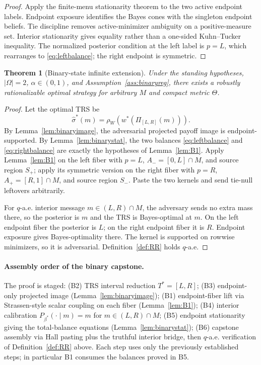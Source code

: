 \documentclass[11pt]{article}
\newtheorem{theorem}{Theorem}
\theoremstyle{definition}
\theoremstyle{remark}
\newcommand{\Om}{\Omega}
\begin{document}
\begin{proof}
Apply the finite-menu stationarity theorem to the two active endpoint labels. Endpoint exposure identifies the Bayes cones with the singleton endpoint beliefs. Tie discipline removes active-minimizer ambiguity on a positive-measure set. Interior stationarity gives equality rather than a one-sided Kuhn--Tucker inequality. The normalized posterior condition at the left label is $p=L$, which rearranges to \eqref{eq:leftbalance}; the right endpoint is symmetric.
\end{proof}

\begin{theorem}[Binary-state infinite extension]\label{thm:binary}
Under the standing hypotheses, $|\Om|=2$, $\alpha\in(0,1)$, and Assumption~\ref{ass:binaryreg}, there exists a robustly rationalizable optimal strategy for arbitrary $M$ and compact metric $\Theta$.
\end{theorem}

\begin{proof}
Let the optimal TRS be
\[
  \hat\sigma^*(m)=\rho_W(w^*(\Pi_{[L,R]}(m))).
\]
By Lemma~\ref{lem:binaryimage}, the adversarial projected payoff image is endpoint-supported. By Lemma~\ref{lem:binarystat}, the two balances \eqref{eq:leftbalance} and \eqref{eq:rightbalance} are exactly the hypotheses of Lemma~\ref{lem:B1}. Apply Lemma~\ref{lem:B1} on the left fiber with $p=L$, $A_-=[0,L]\cap M$, and source region $S_+$; apply its symmetric version on the right fiber with $p=R$, $A_+=[R,1]\cap M$, and source region $S_-$. Paste the two kernels and send tie-null leftovers arbitrarily.

For $q$-a.e. interior message $m\in(L,R)\cap M$, the adversary sends no extra mass there, so the posterior is $m$ and the TRS is Bayes-optimal at $m$. On the left endpoint fiber the posterior is $L$; on the right endpoint fiber it is $R$. Endpoint exposure gives Bayes-optimality there. The kernel is supported on rowwise minimizers, so it is adversarial. Definition~\ref{def:RR} holds $q$-a.e.
\end{proof}

\paragraph{Assembly order of the binary capstone.} The proof is staged: (B2) TRS interval reduction $T^*=[L,R]$; (B3) endpoint-only projected image (Lemma~\ref{lem:binaryimage}); (B1) endpoint-fiber lift via Strassen-style scalar coupling on each fiber (Lemma~\ref{lem:B1}); (B4) interior calibration $P_{\beta^*}(\cdot\mid m)=m$ for $m\in(L,R)\cap M$; (B5) endpoint stationarity giving the total-balance equations (Lemma~\ref{lem:binarystat}); (B6) capstone assembly via Hall pasting plus the truthful interior bridge, then $q$-a.e. verification of Definition~\ref{def:RR} above. Each step uses only the previously established steps; in particular B1 consumes the balances proved in B5.
\end{document}
